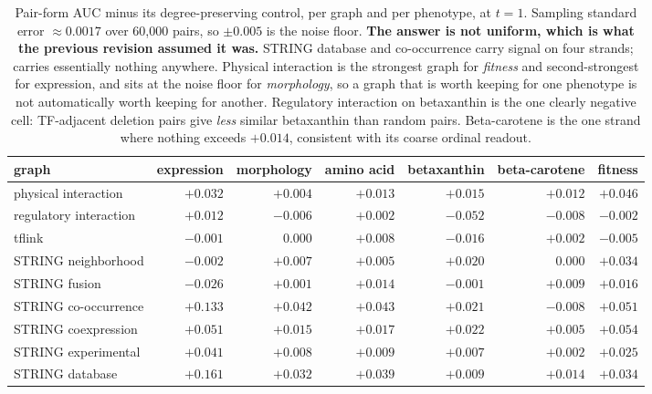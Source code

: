 \begin{table}[htbp]
\centering\footnotesize
\begin{tabular}{lrrrrrr}
\toprule
graph & expression & morphology & amino acid & betaxanthin & beta-carotene & fitness \\
\midrule
physical interaction    & $+0.032$ & $+0.004$ & $+0.013$ & $+0.015$ & $+0.012$ & $\mathbf{+0.046}$ \\
regulatory interaction  & $+0.012$ & $-0.006$ & $+0.002$ & $\mathbf{-0.052}$ & $-0.008$ & $-0.002$ \\
tflink                  & $-0.001$ & $\phantom{+}0.000$ & $+0.008$ & $-0.016$ & $+0.002$ & $-0.005$ \\
STRING neighborhood     & $-0.002$ & $+0.007$ & $+0.005$ & $+0.020$ & $\phantom{+}0.000$ & $\mathbf{+0.034}$ \\
STRING fusion           & $-0.026$ & $+0.001$ & $+0.014$ & $-0.001$ & $+0.009$ & $+0.016$ \\
STRING co-occurrence    & $\mathbf{+0.133}$ & $\mathbf{+0.042}$ & $\mathbf{+0.043}$ & $+0.021$ & $-0.008$ & $\mathbf{+0.051}$ \\
STRING coexpression     & $\mathbf{+0.051}$ & $+0.015$ & $+0.017$ & $+0.022$ & $+0.005$ & $\mathbf{+0.054}$ \\
STRING experimental     & $\mathbf{+0.041}$ & $+0.008$ & $+0.009$ & $+0.007$ & $+0.002$ & $+0.025$ \\
STRING database         & $\mathbf{+0.161}$ & $\mathbf{+0.032}$ & $\mathbf{+0.039}$ & $+0.009$ & $+0.014$ & $\mathbf{+0.034}$ \\
\bottomrule
\end{tabular}
\caption[]{Pair-form AUC minus its degree-preserving control, per graph and per phenotype, at
$t = 1$. Sampling standard error $\approx 0.0017$ over 60,000 pairs, so $\pm 0.005$ is the
noise floor. \textbf{The answer is not uniform, which is what the previous revision assumed
it was.} STRING database and co-occurrence carry signal on four strands; 
carries essentially nothing anywhere. Physical interaction is the strongest graph for
\emph{fitness} and second-strongest for expression, and sits at the noise floor for
\emph{morphology}, so a graph that is worth keeping for one phenotype is not automatically
worth keeping for another. Regulatory interaction on betaxanthin is the one clearly negative
cell: TF-adjacent deletion pairs give \emph{less} similar betaxanthin than random pairs.
Beta-carotene is the one strand where nothing exceeds $+0.014$, consistent with its coarse
ordinal readout.}
\label{tab:graph-pair-form}
\end{table}

